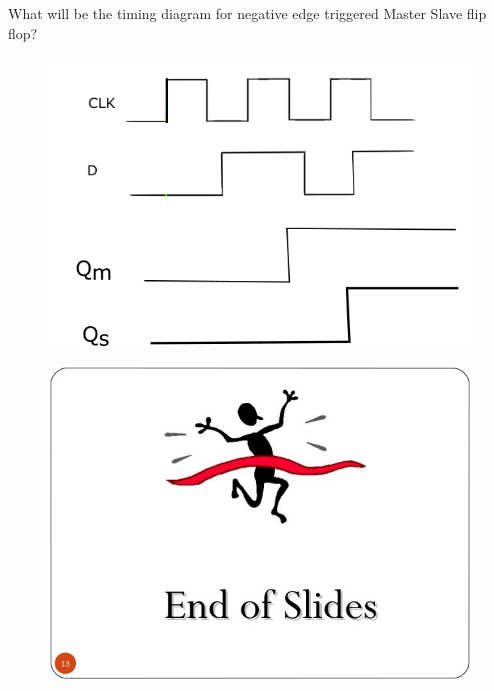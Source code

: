 \documentclass{beamer}
\begin{document}
\begin{frame}
    
    
    \alert{What will be the timing diagram for negative edge triggered Master Slave flip flop?}\pause
    \begin{figure}[H]
        \centering
        
        \includegraphics[scale=.5]{name/path2100.png}
        
        
        \label{fig:my_label}
    \end{figure}
    
\end{frame}

\begin{frame}
    
    
    \begin{figure}[H]
        \centering
        
        \includegraphics[scale=.35]{images/finite-automata-13-638.jpg}
        
        
        \label{fig:my_label}
    \end{figure}
    
\end{frame}
\end{document}
